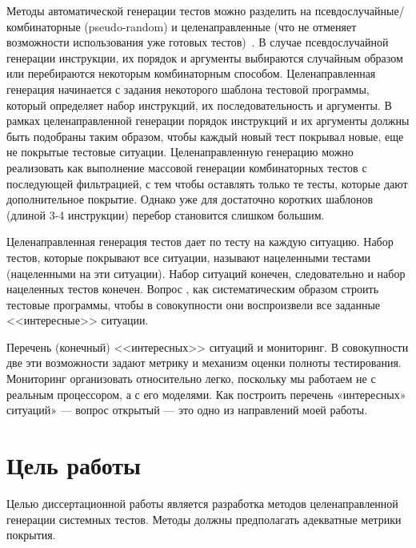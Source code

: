 \documentclass[14pt]{extreport}
\begin{document}
Методы автоматической генерации тестов можно разделить на псевдослучайные/комбинаторные (pseudo-random) и целенаправленные (что не отменяет возможности использования уже готовых тестов)~\cite{HoPhD}. В случае псевдослучайной генерации инструкции, их порядок и аргументы выбираются случайным образом или перебираются некоторым комбинаторным способом. Целенаправленная генерация начинается с задания некоторого шаблона тестовой программы, который определяет набор инструкций, их последовательность и аргументы. В рамках целенаправленной генерации порядок инструкций и их аргументы должны быть подобраны таким образом, чтобы каждый новый тест покрывал новые, еще не покрытые тестовые ситуации. Целенаправленную генерацию можно реализовать как выполнение массовой генерации комбинаторных тестов с последующей фильтрацией, с тем чтобы оставлять только те тесты, которые дают дополнительное покрытие. Однако  уже для достаточно коротких шаблонов (длиной 3-4 инструкции) перебор становится слишком большим.

Целенаправленная генерация тестов дает по тесту на каждую ситуацию. Набор тестов, которые покрывают все ситуации, называют нацеленными тестами (нацеленными на эти ситуации). Набор ситуаций конечен, следовательно и набор нацеленных тестов конечен. Вопрос
, как систематическим образом строить тестовые программы, чтобы в совокупности они воспроизвели все заданные <<интересные>> ситуации.


Перечень (конечный) <<интересных>> ситуаций и мониторинг. В совокупности две эти возможности задают метрику и механизм оценки полноты тестирования. Мониторинг организовать относительно легко, поскольку мы работаем не с реальным процессором, а с его моделями. Как построить перечень «интересных» ситуаций» --- вопрос открытый --- это одно из направлений моей работы.


\section*{Цель работы}

Целью диссертационной работы является разработка методов целенаправленной генерации системных тестов. Методы должны предполагать адекватные метрики покрытия.
\end{document}
